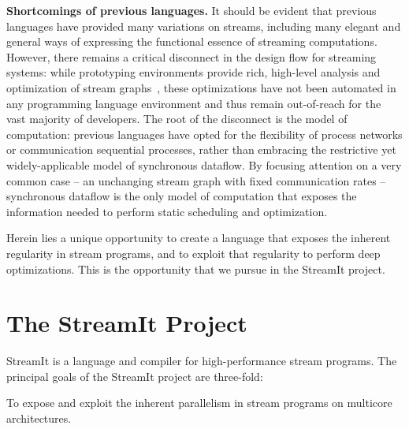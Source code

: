 {\bf Shortcomings of previous languages.}  It should be evident that
previous languages have provided many variations on streams, including
many elegant and general ways of expressing the functional essence of
streaming computations.  However, there remains a critical disconnect
in the design flow for streaming systems: while prototyping
environments provide rich, high-level analysis and optimization of
stream
graphs~\cite{bhattacharyya_optimal_1995,bhattacharyya_software_1996,bhattacharyya_self-timed_1996,ad_data_1997,zitzler_multidimensional_2000,murthy_shared_2001,govindarajan_minimizing_2002,murthy_buffer_2004,geilen_minimising_2005,stuijk_exploring_2006},
these optimizations have not been automated in any programming
language environment and thus remain out-of-reach for the vast
majority of developers.  The root of the disconnect is the model of
computation: previous languages have opted for the flexibility of
process networks or communication sequential processes, rather than
embracing the restrictive yet widely-applicable model of synchronous
dataflow.  By focusing attention on a very common case -- an
unchanging stream graph with fixed communication rates -- synchronous
dataflow is the only model of computation that exposes the information
needed to perform static scheduling and optimization.

Herein lies a unique opportunity to create a language that exposes the
inherent regularity in stream programs, and to exploit that regularity
to perform deep optimizations.  This is the opportunity that we pursue
in the StreamIt project.


\section{The StreamIt Project}
\label{sec:streamit-project}

StreamIt is a language and compiler for high-performance stream
programs.  The principal goals of the StreamIt project are three-fold:

\mybegin

\item To expose and exploit the inherent parallelism in stream
  programs on multicore architectures.

